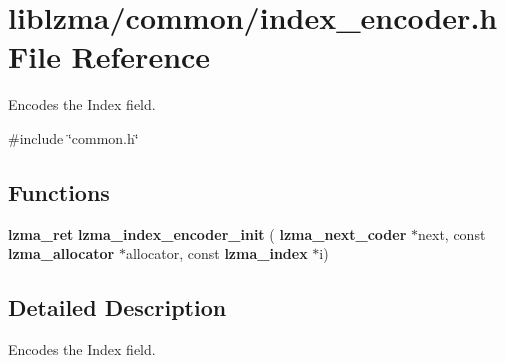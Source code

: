 \section{liblzma/common/index\+\_\+encoder.h File Reference}
\label{index__encoder_8h}


Encodes the Index field.  


{\ttfamily \#include \char`\"{}common.\+h\char`\"{}}\newline
\subsection*{Functions}
\begin{DoxyCompactItemize}
\item 
\mbox{\label{index__encoder_8h_a642c8652ed91df92d0be729d76ddb743}} 
\textbf{ lzma\+\_\+ret} {\bfseries lzma\+\_\+index\+\_\+encoder\+\_\+init} (\textbf{ lzma\+\_\+next\+\_\+coder} $\ast$next, const \textbf{ lzma\+\_\+allocator} $\ast$allocator, const \textbf{ lzma\+\_\+index} $\ast$i)
\end{DoxyCompactItemize}


\subsection{Detailed Description}
Encodes the Index field. 

